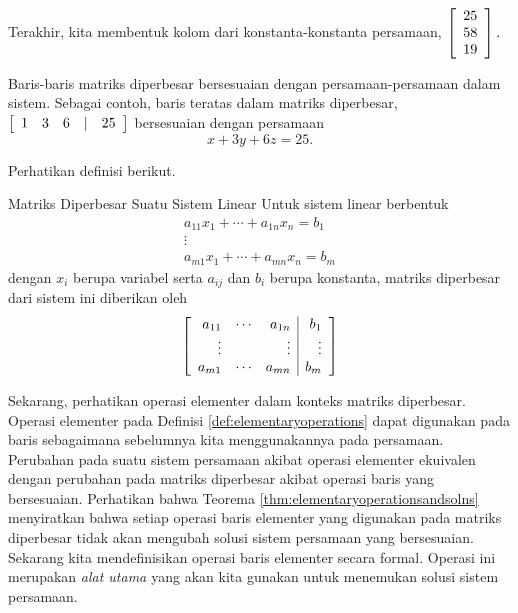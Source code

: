 Terakhir, kita membentuk kolom dari konstanta-konstanta persamaan,
$\left[
\begin{array}{r}
25\\
58\\
19
\end{array}
\right] .$ 

Baris-baris matriks diperbesar bersesuaian dengan persamaan-persamaan dalam sistem. Sebagai contoh, baris
teratas dalam matriks diperbesar,
$\left[
\begin{array}{rrrrr}
1 & 3 & 6 & | & 25
\end{array}
\right]$
 bersesuaian dengan persamaan
\begin{equation*}
x+3y+6z=25.
\end{equation*}

Perhatikan definisi berikut.

\begin{definition}{Matriks Diperbesar Suatu Sistem Linear}\label{def:augmentedmatrix}
Untuk sistem linear berbentuk
\begin{equation*}
\begin{array}{c}
a_{11}x_{1}+\cdots +a_{1n}x_{n}=b_{1} \\
\vdots \\
a_{m1}x_{1}+\cdots +a_{mn}x_{n}=b_{m}
\end{array}
\end{equation*}
dengan $x_{i}$ berupa variabel serta $a_{ij}$ dan $b_{i}$ berupa konstanta,
matriks diperbesar  dari sistem ini diberikan oleh
\begin{equation*}
\left[
\begin{array}{rrr|r}
a_{11} & \cdots & a_{1n} &  b_{1} \\
\vdots &  & \vdots &  \vdots \\
a_{m1} & \cdots & a_{mn} &  b_{m}
\end{array}
\right] 
\end{equation*}
\end{definition}

Sekarang, perhatikan operasi elementer dalam konteks matriks diperbesar. Operasi elementer pada Definisi \ref{def:elementaryoperations}
dapat digunakan pada baris sebagaimana sebelumnya kita menggunakannya pada persamaan. Perubahan pada suatu sistem persamaan akibat
operasi elementer ekuivalen dengan perubahan pada matriks diperbesar akibat operasi baris yang bersesuaian. Perhatikan bahwa Teorema \ref{thm:elementaryoperationsandsolns} menyiratkan bahwa
setiap operasi baris elementer yang digunakan pada matriks diperbesar tidak akan mengubah solusi sistem persamaan yang bersesuaian.
Sekarang kita mendefinisikan operasi baris elementer secara formal. Operasi ini merupakan {\em alat utama \em}yang akan kita gunakan untuk menemukan solusi sistem persamaan.

